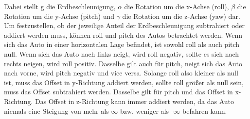 Dabei stellt g die Erdbeschleunigung, $\alpha$ die Rotation um die x-Achse (roll), $\beta$ die Rotation um die y-Achse (pitch) und $\gamma$ die Rotation um die z-Achse (yaw) dar. \\
Um festzustellen, ob der jeweilige Anteil der Erdbeschleunigung subtrahiert oder addiert werden muss, können roll und pitch des Autos betrachtet werden. Wenn sich das Auto in einer horizontalen Lage befindet, ist sowohl roll als auch pitch null. Wenn sich das Auto nach links neigt, wird roll negativ, sollte es sich nach rechts neigen, wird roll positiv. Dasselbe gilt auch für pitch, neigt sich das Auto nach vorne, wird pitch negativ und vice versa. Solange roll also kleiner als null ist, muss das Offset in y-Richtung addiert werden, sollte roll größer als null sein, muss das Offset subtrahiert werden. Dasselbe gilt für pitch und das Offset in x-Richtung. Das Offset in z-Richtung kann immer addiert werden, da das Auto niemals eine Steigung von mehr als $\infty$ bzw. weniger als -$\infty$ befahren kann.